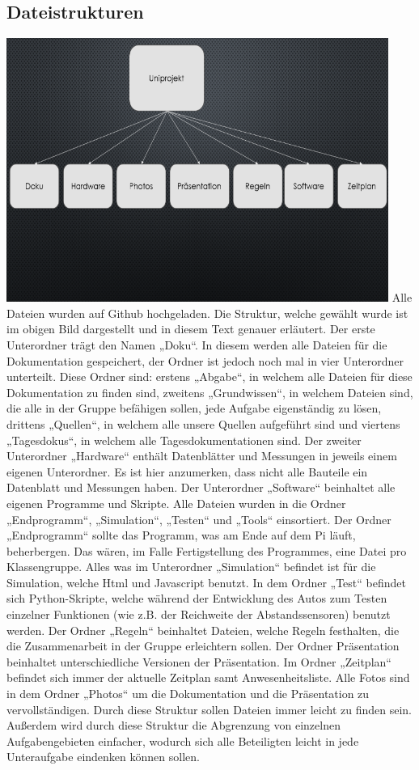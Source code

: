 \documentclass[notitlepage]{report}
\begin{document}
\subsection{Dateistrukturen}

\includegraphics{Struktur.png}
Alle Dateien wurden auf Github hochgeladen. Die Struktur, welche gew\"{a}hlt wurde ist im obigen Bild dargestellt und in diesem Text genauer erl\"{a}utert. 
Der erste Unterordner tr\"{a}gt den Namen „Doku“. In diesem werden alle Dateien f\"{u}r die Dokumentation gespeichert, der Ordner ist jedoch noch mal in vier Unterordner unterteilt. Diese Ordner sind: erstens „Abgabe“, in welchem alle Dateien f\"{u}r diese Dokumentation zu finden sind, zweitens „Grundwissen“, in welchem Dateien sind, die alle in der Gruppe bef\"{a}higen sollen, jede Aufgabe eigenst\"{a}ndig zu l\"{o}sen, drittens „Quellen“, in welchem alle unsere Quellen aufgef\"{u}hrt sind und viertens „Tagesdokus“, in welchem alle Tagesdokumentationen sind.
Der zweiter Unterordner „Hardware“ enth\"{a}lt Datenbl\"{a}tter und Messungen in jeweils einem eigenen Unterordner. Es ist hier anzumerken, dass nicht alle Bauteile ein Datenblatt und Messungen haben.
Der Unterordner „Software“ beinhaltet alle eigenen Programme und Skripte. Alle Dateien wurden in die Ordner „Endprogramm“, „Simulation“, „Testen“ und „Tools“ einsortiert. Der Ordner „Endprogramm“ sollte das Programm, was am Ende auf dem Pi l\"{a}uft, beherbergen. Das w\"{a}ren, im Falle Fertigstellung des Programmes, eine Datei pro Klassengruppe.  Alles was im Unterordner „Simulation“ befindet ist f\"{u}r die Simulation, welche Html und Javascript benutzt. In dem Ordner „Test“ befindet sich Python-Skripte, welche w\"{a}hrend der Entwicklung des Autos zum Testen einzelner Funktionen (wie z.B. der Reichweite der Abstandssensoren) benutzt werden.
Der Ordner „Regeln“ beinhaltet Dateien, welche Regeln festhalten, die die Zusammenarbeit in der Gruppe erleichtern sollen. Der Ordner Pr\"{a}sentation beinhaltet unterschiedliche Versionen der Pr\"{a}sentation. Im Ordner „Zeitplan“ befindet sich immer der aktuelle Zeitplan samt Anwesenheitsliste.  Alle Fotos sind in dem Ordner „Photos“ um die Dokumentation und die Pr\"{a}sentation zu vervollst\"{a}ndigen. 
Durch diese Struktur sollen Dateien immer leicht zu finden sein. Au{\ss}erdem wird durch diese Struktur die Abgrenzung von einzelnen Aufgabengebieten einfacher, wodurch sich alle Beteiligten leicht in jede Unteraufgabe eindenken k\"{o}nnen sollen. 
\end{document}
